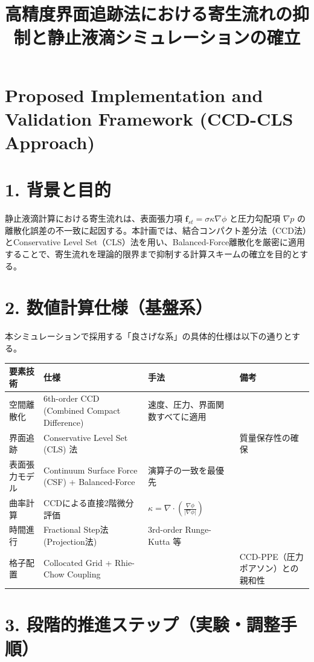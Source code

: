 \documentclass[12pt, a4paper, titlepage, xelatex, ja=standard, jafont=hiragino-pron, twoside]{bxjsarticle}
\title{高精度界面追跡法における寄生流れの抑制と静止液滴シミュレーションの確立}
\author{}
\date{}
\begin{document}
\maketitle

\section*{Proposed Implementation and Validation Framework (CCD-CLS Approach)}

\section*{1. 背景と目的}
静止液滴計算における寄生流れは、表面張力項 $\mathbf{f}_{st} = \sigma \kappa \nabla \phi$ と圧力勾配項 $\nabla p$ の離散化誤差の不一致に起因する。本計画では、結合コンパクト差分法（CCD法）とConservative Level Set（CLS）法を用い、Balanced-Force離散化を厳密に適用することで、寄生流れを理論的限界まで抑制する計算スキームの確立を目的とする。

\section*{2. 数値計算仕様（基盤系）}
本シミュレーションで採用する「良さげな系」の具体的仕様は以下の通りとする。

\noindent\begin{tabularx}{\linewidth}{|l|X|X|l|}
\hline
\textbf{要素技術} & \textbf{仕様} & \textbf{手法} & \textbf{備考} \\
\hline
空間離散化 & 6th-order CCD (Combined Compact Difference) & 速度、圧力、界面関数すべてに適用 &  \\
界面追跡 & Conservative Level Set (CLS) 法 &  & 質量保存性の確保 \\
表面張力モデル & Continuum Surface Force (CSF) + Balanced-Force & 演算子の一致を最優先 &  \\
曲率計算 & CCDによる直接2階微分評価 & $\kappa = \nabla \cdot (\frac{\nabla \phi}{|\nabla \phi|})$ &  \\
時間進行 & Fractional Step法 (Projection法) & 3rd-order Runge-Kutta 等 &  \\
格子配置 & Collocated Grid + Rhie-Chow Coupling &  & CCD-PPE（圧力ポアソン）との親和性 \\
\hline
\end{tabularx}

\section*{3. 段階的推進ステップ（実験・調整手順）}
\end{document}
